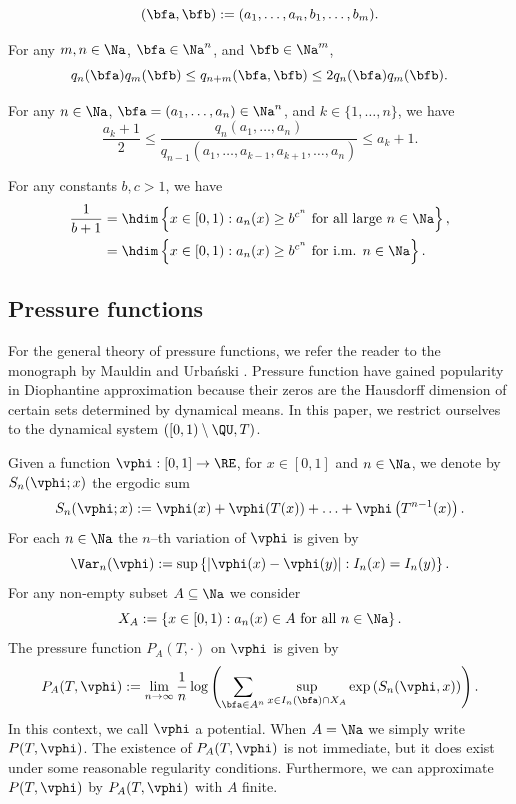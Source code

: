 \documentclass[12pt,a4paper]{amsart}
\begin{document}
\[
(\bfa,\bfb)
:=
(a_1,\ldots, a_n,b_1,\ldots, b_m).
\]
\begin{lem01}
For any $m,n\in\Na$,  $\bfa\in\Na^n$, and $\bfb\in\Na^m$, 
\[
q_{n}(\bfa)q_{m}(\bfb)
\leq
q_{n+m}(\bfa,\bfb)
\leq 
2q_{n}(\bfa)q_{m}(\bfb).
\]
\end{lem01}
\begin{lem01}[{\cite[Lemma 2.1]{Wu2006}}]
For any $n\in\Na$,  $\bfa=(a_1,\ldots, a_n)\in\Na^n$, and $k\in\{1,\ldots,n\}$, we have
\[
\frac{a_{k} + 1}{2}
\leq 
\frac{q_n(a_1,\ldots, a_n)}{q_{n-1}(a_1,\ldots,a_{k-1},a_{k+1},\ldots, a_n)}
\leq 
a_{k}+1.
\]
\end{lem01}

\begin{lem01}\label{Lem:Luczak}
For any constants $b,c>1$, we have 
\begin{align*}
\frac{1}{b+1}
&=
\hdim
\left\{ x\in [0,1): a_n(x)\geq b^{c^n} \text{ for all large } n\in\Na \right\}, \\
&=
\hdim
\left\{ x\in [0,1): a_n(x)\geq b^{c^n} \text{ for i.m.   } n\in\Na\right\}.
\end{align*}
\end{lem01}



\subsection{Pressure functions}
For the general theory of pressure functions, we refer the reader to the monograph by Mauldin and Urba{\'n}ski \cite{MauldinUrbanskiBook}. Pressure function have gained popularity in Diophantine approximation because their zeros are the Hausdorff dimension of certain sets determined by dynamical means. In this paper, we restrict ourselves to the dynamical system $([0,1)\setminus \QU,T)$. 

Given a function $\vphi:[0,1] \to\RE$, for $x\in [0,1]$ and $n\in\Na$, we denote by $S_n(\vphi;x)$ the ergodic sum
\[
S_n(\vphi;x)
:=
\vphi(x) + \vphi(T(x)) + \ldots + \vphi\left(T^{n-1}(x)\right).
\]
For each $n\in\Na$ the $n$--th variation of $\vphi$ is given by
\[
\Var_n(\vphi)
:=
\sup\left\{ |\vphi(x)-\vphi(y)|:I_n(x)=I_n(y)\right\}.
\]
For any non-empty subset $A\subseteq \Na$ we consider
\[
X_A
:=
\left\{ x\in [0,1): a_n(x)\in A \text{ for all } n\in\Na\right\}.
\]
The pressure function $P_{A}(T,\cdot)$ on $\vphi$ is given by
\[
P_{A}(T,\vphi)
:=
\lim_{n\to\infty} 
\frac{1}{n} 
\log\left( 
\sum_{\bfa\in A^n} \sup_{x\in I_n(\bfa)\cap X_{ A}} \exp\left( S_n(\vphi,x)\right)
\right).
\]
In this context, we call $\vphi$ a potential. When $A=\Na$ we simply write $P(T,\vphi)$. The existence of $P_{A}(T,\vphi)$ is not immediate, but it does exist under some reasonable regularity conditions. Furthermore, we can approximate $P(T,\vphi)$ by $P_{A}(T,\vphi)$ with $A$ finite.
\end{document}
